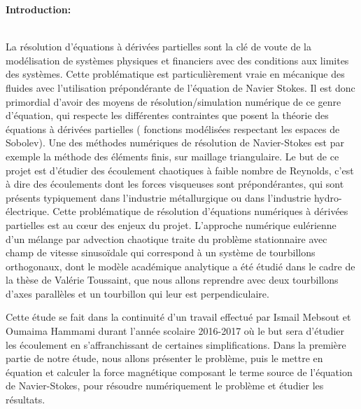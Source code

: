 \documentclass[a4paper,12pt,titlepage]{report}
\begin{document}
\tableofcontents

\newpage




\textbf{\Huge Introduction:}
\\
\\
\begin{onehalfspace}
La résolution d'équations à dérivées partielles sont la clé de voute de la modélisation de systèmes physiques et financiers avec des conditions aux limites des systèmes. Cette problématique est particulièrement vraie en mécanique des fluides avec l'utilisation prépondérante de l'équation de Navier Stokes. Il est donc primordial d'avoir des moyens de résolution/simulation numérique de ce genre d'équation, qui respecte les différentes contraintes que posent la théorie des équations à dérivées partielles ( fonctions modélisées respectant les espaces de Sobolev). Une des méthodes numériques de résolution de Navier-Stokes est par exemple la méthode des éléments finis, sur maillage triangulaire. 
\newline
Le but de ce projet est d'étudier des écoulement chaotiques à faible nombre de Reynolds, c'est à dire des écoulements dont les forces visqueuses sont prépondérantes, qui sont présents typiquement dans l'industrie métallurgique ou dans l'industrie hydro-électrique. Cette problématique de résolution d'équations numériques à dérivées partielles est au cœur des enjeux du projet.
\newline
\newline
L'approche numérique eulérienne d'un mélange par advection chaotique traite du problème stationnaire avec champ de vitesse sinusoïdale qui correspond à un système de tourbillons orthogonaux, dont le modèle académique analytique a été étudié dans le cadre de la thèse de Valérie Toussaint, que nous allons reprendre avec deux tourbillons d'axes parallèles et un tourbillon qui leur est perpendiculaire.

Cette étude se fait dans la continuité d'un travail effectué par Ismail Mebsout et Oumaima Hammami durant l'année scolaire 2016-2017 où le but sera d'étudier les écoulement en s'affranchissant de certaines simplifications.
Dans la première partie de notre étude, nous allons présenter le problème, puis le mettre en équation et calculer la force magnétique composant le terme source de l'équation de Navier-Stokes, pour résoudre numériquement le problème et étudier les résultats.


\end{onehalfspace}
\end{document}
